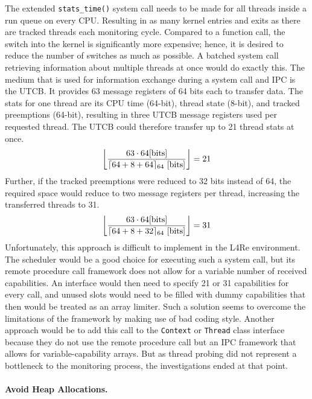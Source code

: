 The extended \texttt{stats\_time()} system call needs to be made for all threads inside a run queue on every CPU.
Resulting in as many kernel entries and exits as there are tracked threads each monitoring cycle.
Compared to a function call, the switch into the kernel is significantly more expensive; hence, it is desired to reduce the number of switches as much as possible.
A batched system call retrieving information about multiple threads at once would do exactly this.
The medium that is used for information exchange during a system call and IPC is the UTCB.
It provides 63 message registers of 64 bits each to transfer data.
The stats for one thread are its CPU time (64-bit), thread state (8-bit), and tracked preemptions (64-bit), resulting in three UTCB message registers used per requested thread.
The UTCB could therefore transfer up to 21 thread stats at once.
\[
\left\lfloor \frac{63 \cdot 64\text{\lbrack bits\rbrack}}{\lceil 64 + 8 + 64\rceil_{64} \text{ \lbrack bits\rbrack}}\right\rfloor = 21
\]
Further, if the tracked preemptions were reduced to 32 bits instead of 64, the required space would reduce to two message registers per thread, increasing the transferred threads to 31.
\[
\left\lfloor \frac{63 \cdot 64\text{\lbrack bits\rbrack}}{\lceil 64 + 8 + 32\rceil_{64} \text{ \lbrack bits\rbrack}}\right\rfloor = 31
\]
Unfortunately, this approach is difficult to implement in the L4Re environment.
The scheduler would be a good choice for executing such a system call, but its remote procedure call framework does not allow for a variable number of received capabilities.
An interface would then need to specify 21 or 31 capabilities for every call, and unused slots would need to be filled with dummy capabilities that then would be treated as an array limiter.
Such a solution seems to overcome the limitations of the framework by making use of bad coding style.
Another approach would be to add this call to the \texttt{Context} or \texttt{Thread} class interface because they do not use the remote procedure call but an IPC framework that allows for variable-capability arrays.
But as thread probing did not represent a bottleneck to the monitoring process, the investigations ended at that point.

\paragraph{Avoid Heap Allocations.}

